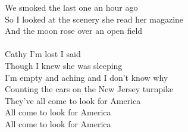  We smoked the  last one an  hour ago\\
 So I looked at the  scenery  she read her magazine\\
And the  moon  rose  over an  open  field \\
  \\
 Cathy I'm  lost I  said\\
Though I  knew she was  sleeping  \\
I'm  empty and  aching and  I don't know why\\
 Counting the cars on the New Jersey turnpike\\
They've  all  come to  look for America\\
 All  come to  look for America\\
 All  come to  look for America\\
      \\
